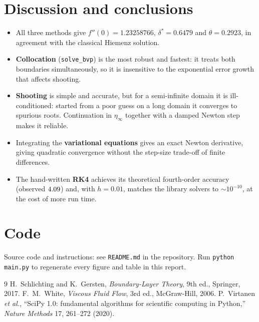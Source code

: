 \documentclass[11pt,a4paper]{article}
\begin{document}
\section{Discussion and conclusions}
\begin{itemize}
\item All three methods give $f''(0) = 1.23258766$, $\delta^* = 0.6479$ and $\theta = 0.2923$,
in agreement with the classical Hiemenz solution.
\item \textbf{Collocation} (\texttt{solve\_bvp}) is the most robust and fastest: it treats both
boundaries simultaneously, so it is insensitive to the exponential error growth that affects shooting.
\item \textbf{Shooting} is simple and accurate, but for a semi-infinite domain it is ill-conditioned:
started from a poor guess on a long domain it converges to spurious roots. Continuation in
$\eta_\infty$ together with a damped Newton step makes it reliable.
\item Integrating the \textbf{variational equations} gives an exact Newton derivative, giving
quadratic convergence without the step-size trade-off of finite differences.
\item The hand-written \textbf{RK4} achieves its theoretical fourth-order accuracy (observed $4.09$)
and, with $h = 0.01$, matches the library solvers to $\sim10^{-10}$, at the cost of more run time.
\end{itemize}

\section*{Code}
Source code and instructions: see \texttt{README.md} in the repository.
Run \texttt{python main.py} to regenerate every figure and table in this report.

\begin{thebibliography}{9}
 H.~Schlichting and K.~Gersten, \emph{Boundary-Layer Theory}, 9th ed., Springer, 2017.
 F.~M.~White, \emph{Viscous Fluid Flow}, 3rd ed., McGraw-Hill, 2006.
 P.~Virtanen \emph{et al.}, ``SciPy 1.0: fundamental algorithms for scientific computing in Python,'' \emph{Nature Methods} 17, 261--272 (2020).
\end{thebibliography}
\end{document}
